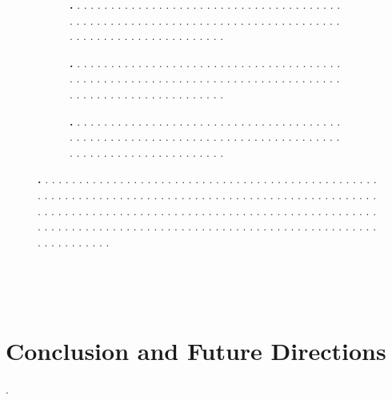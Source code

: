 \documentclass[letterpaper,10pt,conference,twoside]{IEEEtran}
\theoremstyle{definition}
\begin{document}
\begin{figure}[t!]
  \centering
  \begin{subfigure}[t]{\linewidth}
  \hspace*{-.15cm}
  \caption{\textbf{.   }.   .   .   .   .   .   .   .   .   .   .   .   .   .   .   .   .   .   .   .   .   .   .   .   .   .   .   .   .   .   .   .   .   .   .   .   .   .   .   .   .   .   .   .   .   .   .   .   .   .   .   .   .   .   .   .   .   .   .   .   .   .   .   .   .   .   .   .   .   .   .   .   .   .   .   .   .   .   .   .   .   .   .   .   .   .   .   .   .   .   .   .   .   .   .   .   .   .   .   .   .   .}
  \end{subfigure}
  \begin{subfigure}[t]{\linewidth}
  \hspace*{-.15cm}
  \caption{\textbf{.   }.   .   .   .   .   .   .   .   .   .   .   .   .   .   .   .   .   .   .   .   .   .   .   .   .   .   .   .   .   .   .   .   .   .   .   .   .   .   .   .   .   .   .   .   .   .   .   .   .   .   .   .   .   .   .   .   .   .   .   .   .   .   .   .   .   .   .   .   .   .   .   .   .   .   .   .   .   .   .   .   .   .   .   .   .   .   .   .   .   .   .   .   .   .   .   .   .   .   .   .   .   .}
  \end{subfigure}
  \begin{subfigure}[t]{\linewidth}
  \hspace*{-.15cm}
  \caption{\textbf{.   }.   .   .   .   .   .   .   .   .   .   .   .   .   .   .   .   .   .   .   .   .   .   .   .   .   .   .   .   .   .   .   .   .   .   .   .   .   .   .   .   .   .   .   .   .   .   .   .   .   .   .   .   .   .   .   .   .   .   .   .   .   .   .   .   .   .   .   .   .   .   .   .   .   .   .   .   .   .   .   .   .   .   .   .   .   .   .   .   .   .   .   .   .   .   .   .   .   .   .   .   .   .}
  \end{subfigure}
  \caption[.]{\textbf{.   }.   .   .   .   .   .   .   .   .   .   .   .   .   .   .   .   .   .   .   .   .   .   .   .   .   .   .   .   .   .   .   .   .   .   .   .   .   .   .   .   .   .   .   .   .   .   .   .   .   .   .   .   .   .   .   .   .   .   .   .   .   .   .   .   .   .   .   .   .   .   .   .   .   .   .   .   .   .   .   .   .   .   .   .   .   .   .   .   .   .   .   .   .   .   .   .   .   .   .   .   .   .   .   .   .   .   .   .   .   .   .   .   .   .   .   .   .   .   .   .   .   .   .   .   .   .   .   .   .   .   .   .   .   .   .   .   .   .   .   .   .   .   .   .   .   .   .   .   .   .   .   .   .   .   .   .   .   .   .   .   .   .   .   .   .   .   .   .   .   .   .   .   .   .   .   .   .   .   .   .   .   .   .   .   .   .   .   .   .   .   .   .   .   .   .   .   .   .   .   .   .   .   .   .   .   .   .   .   .   .}
  \label{fig:1}
\end{figure}


~ 
\newpage

~
\newpage


\section{Conclusion and Future Directions}\label{sec:conc}
\noindent
.

{\small
 

}
\end{document}
